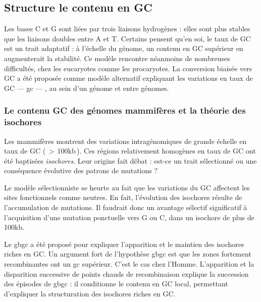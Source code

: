 \documentclass[11pt, oneside]{scrartcl}
\begin{document}
\subsection{Structure le contenu en GC}
\label{sec:orgheadline14}
Les bases C et G sont liées par trois liaisons hydrogènes : elles sont plus
stables que les liaisons doubles entre A et T. Certains pensent qu'en soi, le
taux de GC est un trait adaptatif : à l'échelle du génome, un contenu en GC
supérieur en augmenterait la stabilité. Ce modèle rencontre néanmoins de
nombreuses difficultés, chez les eucaryotes comme les procaryotes. La conversion
biaisée vers GC a été proposée comme modèle alternatif expliquant les variations
en taux de GC --- \ac{gc} --- , au sein d'un génome et entre génomes.



\subsubsection{Le contenu GC des génomes mammifères et la théorie des isochores}
\label{sec:orgheadline12}
Les mammifères montrent des variations intragénomiques de grande échelle en taux
de GC\cite{eyre-walker_evolution_2001} ( \(>\) 100kb ). Ces régions relativement
homogènes en taux de GC ont été baptisées \emph{isochores}. Leur origine fait débat :
est-ce un trait sélectionné ou une conséquence évolutive des patrons de
mutations ?

Le modèle sélectionniste se heurte au fait que les variations du GC affectent
les sites fonctionnels comme neutres. En fait, l'évolution des isochores résulte
de l'accumulation de mutations. Il faudrait donc un avantage sélectif
significatif à l'acquisition d'une mutation ponctuelle vers G ou C, dans un
isochore de plus de 100kb.

Le \ac{gbgc} a été proposé pour expliquer l'apparition et le maintien des isochores
riches en GC\cite{duret_new_2006}. Un argument fort de l'hypothèse \ac{gbgc} est que
les zones fortement recombinantes ont un \ac{gc} supérieur. C'est le cas chez
l'Homme\cite{duret_impact_2008, berglund_hotspots_2009}. L'apparition et la
disparition successive de points chauds de recombinaison explique la succession
des épisodes de \ac{gbgc} : il conditionne le contenu en GC local, permettant
d'expliquer la structuration des isochores riches en GC. 
\end{document}
